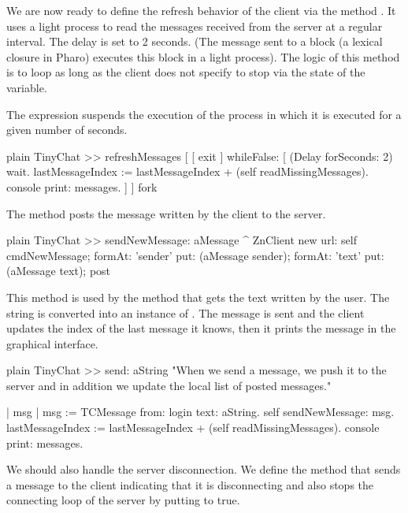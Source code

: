 \documentclass[10pt,twoside,english]{_support/latex/sbabook/sbabook}
\begin{document}
We are now ready to define the refresh behavior of the client via the method .
It uses a light process to read the messages received from the server at a regular interval. 
The delay is set to 2 seconds. (The message  sent to a block (a lexical closure in Pharo) executes this block in a light process). The logic of this method is to loop as long as the client does not specify to stop via the state of the  variable. 

The expression  suspends the execution of the process in which it is executed for a given number of seconds. 

\begin{displaycode}{plain}
TinyChat >> refreshMessages
	[  
		[ exit ] whileFalse: [  
			(Delay forSeconds: 2) wait.
			lastMessageIndex := lastMessageIndex + (self readMissingMessages).
			console print: messages.
		]
	] fork
\end{displaycode}

The method  posts the message written by the client to the server. 

\begin{displaycode}{plain}
TinyChat >> sendNewMessage: aMessage
	^ ZnClient new
		url: self cmdNewMessage;
		formAt: 'sender' put:  (aMessage sender);
		formAt: 'text' put: (aMessage text);
		post
\end{displaycode}

This method is used by the method  that gets the text written by the user. 
The string is converted into an instance of . The message is sent and the client updates the index of the last
message it knows, then it prints the message in the graphical interface.

\begin{displaycode}{plain}
TinyChat >> send: aString
	"When we send a message, we push it to the server and in addition we update the local list of posted messages."
	
	| msg |
	msg := TCMessage from: login text: aString.
	self sendNewMessage: msg.
	lastMessageIndex := lastMessageIndex + (self readMissingMessages).
	console print: messages.
\end{displaycode}

We should also handle the server disconnection. We define the method 
  that sends a message to the client indicating that it is disconnecting and also stops 
 the connecting loop of the server by putting  to true.
\end{document}

